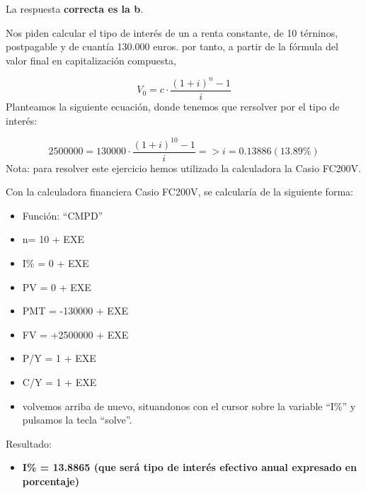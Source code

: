 \documentclass[
  letterpaper,
  DIV=11,
  numbers=noendperiod]{scrreprt}
\providecommand{\tightlist}{%
  \setlength{\itemsep}{0pt}\setlength{\parskip}{0pt}}\usepackage{longtable,booktabs,array}
\begin{document}
\begin{tcolorbox}[enhanced jigsaw, left=2mm, opacityback=0, colback=white, breakable, arc=.35mm, bottomrule=.15mm, rightrule=.15mm, toprule=.15mm, leftrule=.75mm, colframe=quarto-callout-tip-color-frame]
\begin{minipage}[t]{5.5mm}
\textcolor{quarto-callout-tip-color}{\faLightbulb}
\end{minipage}%
\begin{minipage}[t]{\textwidth - 5.5mm}

La respuesta \textbf{correcta es la b}.

Nos piden calcular el tipo de interés de un a renta constante, de 10
térninos, postpagable y de cuantía 130.000 euros. por tanto, a partir de
la fórmula del valor final en capitalización compuesta,

\[V_0=c\cdot\frac{\left(1+i\right)^n-1}{i}\] Planteamos la siguiente
ecuación, donde tenemos que rersolver por el tipo de interés:

\[2500000=130000\cdot\frac{\left(1+i\right)^{10}-1}{i}=>i=0.13886(13.89\%)\]
Nota: para resolver este ejercicio hemos utilizado la calculadora la
Casio FC200V.

Con la calculadora financiera Casio FC200V, se calcularía de la
siguiente forma:

\begin{itemize}
\item
  Función: ``CMPD''
\item
  n= 10 + EXE
\item
  I\% = 0 + EXE
\item
  PV = 0 + EXE
\item
  PMT = -130000 + EXE
\item
  FV = +2500000 + EXE
\item
  P/Y = 1 + EXE
\item
  C/Y = 1 + EXE
\item
  volvemos arriba de nuevo, situandonos con el cursor sobre la variable
  ``I\%'' y pulsamos la tecla ``solve''.
\end{itemize}

Resultado:

\begin{itemize}
\tightlist
\item
  \textbf{I\% = 13.8865 (que será tipo de interés efectivo anual
  expresado en porcentaje)}
\end{itemize}

\end{minipage}%
\end{tcolorbox}
\end{document}
